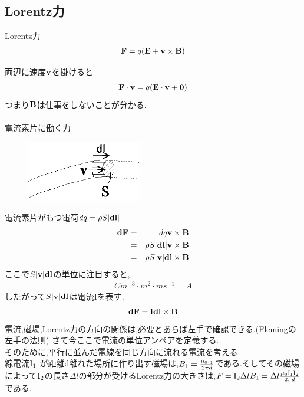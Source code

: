 \documentclass{jsarticle}
\begin{document}
\subsection{Lorentz力}
\begin{itembox}[c]{Lorentz力}
\begin{eqnarray}
{\bf F} = q ({\bf E} + {\bf v} \times {\bf B})
\end{eqnarray}
\end{itembox}
両辺に速度${\bf v}$を掛けると
\begin{eqnarray*}
{\bf F}\cdot{\bf v} = q ( {\bf E}\cdot{\bf v} + {\bf 0} )
\end{eqnarray*}
つまり${\bf B}$は仕事をしないことが分かる. \\
\\
電流素片に働く力 \\
\begin{figure}[htbp]
 \begin{center}
  \includegraphics[width=50mm]{9.6.eps}
 \end{center}
 \caption{}
 \label{fig:six}
\end{figure}
電流素片がもつ電荷$dq=\rho S|{\bf dl}|$ \\
\begin{eqnarray*}
{\bf dF}&=&dq{\bf v} \times {\bf B} \\
&=&\rho S |{\bf dl}| {\bf v} \times {\bf B} \\
&=&\rho S |{\bf v}| {\bf dl}  \times {\bf B}
\end{eqnarray*}
ここで$S |{\bf v}| {\bf dl}$の単位に注目すると, \\
\begin{eqnarray*}
Cm^{-3} \cdot m^2 \cdot ms^{-1} = A
\end{eqnarray*}
したがって$S |{\bf v}| {\bf dl}$は電流{\rm I}を表す.
\begin{eqnarray*}
{\bf dF} ={\rm I} {\bf dl}  \times {\bf B}
\end{eqnarray*}
電流,磁場,Lorentz力の方向の関係は,必要とあらば左手で確認できる.(Flemingの左手の法則)
さて今ここで電流の単位アンペアを定義する. \\
そのために,平行に並んだ電線を同じ方向に流れる電流を考える. \\
線電流${\rm I_1}$ が距離d離れた場所に作り出す磁場は,$B_1=\frac{\mu_0 {\rm I_1}}{2 \pi d}$である.そしてその磁場によって${\rm I_2}$の長さ$\Delta l$の部分が受けるLorentz力の大きさは,$F={\rm I_2} \Delta l B_1=\Delta l \frac{\mu_0 {\rm I_1}{\rm I_2}}{2 \pi d}$である. \\
\end{document}
